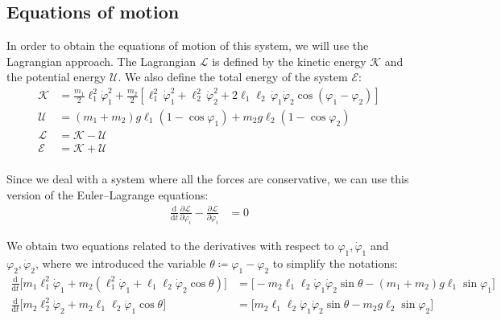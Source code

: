 \documentclass[11 pt]{article}
\begin{document}
\subsection{Equations of motion}
In order to obtain the equations of motion of this system, we will use the Lagrangian approach. The Lagrangian $\mathcal{L}$ is defined by the kinetic energy $\mathcal{K}$ and the potential energy $\mathcal{U}$. We also define the total energy of the system $\mathcal{E}$:
\begin{equation*}
\begin{aligned}
    \mathcal{K} &=\frac{m_1}{2} \ell_1^2 \dot \varphi_1^2 + \frac{m_2}{2} \left[ \ell_1^2\, \dot \varphi_1^2 + \ell_2^2\, \dot \varphi_2^2  + 2 \ell_1 \ell_2 \, \dot \varphi_1 \dot \varphi_2 \cos{\left(\varphi_1 - \varphi_2\right)}\right]\\
    \mathcal{U} &= \left(m_1+m_2\right)g \ell_1 \left(1 - \cos{\varphi_1}\right) + m_2 g \ell_2 \left(1 - \cos \varphi_2\right)\\
    \mathcal{L} &= \mathcal{K} - \mathcal{U}\\
    \mathcal{E} &= \mathcal{K} + \mathcal{U}\\
\end{aligned}
\end{equation*}

Since we deal with a system where all the forces are conservative, we can use this version of the Euler–Lagrange equations:
\begin{equation*}
\begin{aligned}
    \frac{\mathrm{d}}{\mathrm{d}t} \frac{\partial \mathcal{L}}{\partial \dot \varphi_i} - \frac{\partial \mathcal{L}}{\partial \varphi_i} &= 0
\end{aligned}
\end{equation*}

We obtain two equations related to the derivatives with respect to $\varphi_1, \dot \varphi_1$ and $\varphi_2, \dot \varphi_2$, where we introduced the variable $\theta \coloneqq \varphi_1 - \varphi_2$ to simplify the notations:
\small{
\begin{align*}
    \frac{\mathrm{d}}{\mathrm{d}t} \Big[m_1 \ell_1^2 \dot \varphi_1 + m_2 \left(\ell_1^2 \dot \varphi_1 + \ell_1 \ell_2 \dot \varphi_2 \cos \theta \right)\Big] &= \Big[-m_2 \ell_1 \ell_2 \dot \varphi_1 \dot \varphi_2 \sin{\theta} - (m_1+m_2)g \ell_1 \sin \varphi_1 \Big]\\
    \frac{\mathrm{d}}{\mathrm{d}t} \Big[m_2 \ell_2^2 \dot \varphi_2 + m_2\ell_1 \ell_2 \dot \varphi_1 \cos \theta \Big] &= \Big[m_2 \ell_1 \ell_2 \dot \varphi_1 \dot \varphi_2 \sin{\theta} - m_2 g \ell_2 \sin \varphi_2\Big]
\end{align*}
}
\normalsize
\end{document}
